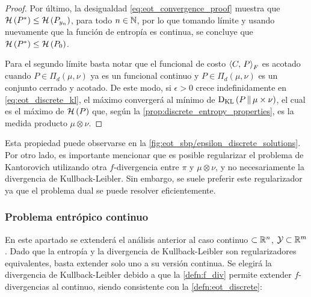 \begin{proof}
	Por último, la desigualdad \eqref{eq:eot_convergence_proof} muestra que $\mathcal{H}\left(P^*\right)\leq\mathcal{H}\left(P_{y_n}\right)$, para todo $n\in\mathbb{N}$, por lo que tomando límite y usando nuevamente que la función de entropía es continua, se concluye que $\mathcal{H}\left(P^*\right)\leq\mathcal{H}\left(P_0\right)$.

	Para el segundo límite basta notar que el funcional de costo $\left\langle C,\,P\right\rangle_F$ es acotado cuando $P\in\Pi_d(\mu,\nu)$ ya es un funcional continuo y $P\in\Pi_d(\mu,\nu)$ es un conjunto cerrado y acotado. De este modo, si $\epsilon>0$ crece indefinidamente en \eqref{eq:eot_discrete_kl}, el máximo convergerá al mínimo de $\operatorname{D_{KL}}\left(P\,\|\,\mu\times\nu\right)$, el cual es el máximo de $\mathcal{H}\left(P\right)$ que, según la \autoref{prop:discrete_entropy_properties}, es la medida producto $\mu\otimes\nu$.
\end{proof}

Esta propiedad puede observarse en la \autoref{fig:eot_sbp/epsilon_discrete_solutions}. Por otro lado, es importante mencionar que es posible regularizar el problema de Kantorovich utilizando otra $f$-divergencia entre $\pi$ y $\mu\otimes\nu$, y no necesariamente la divergencia de Kullback-Leibler. Sin embargo, se suele preferir este regularizador ya que el problema dual se puede resolver eficientemente.


\subsubsection{Problema entrópico continuo}

En este apartado se extenderá el análisis anterior al caso continuo $\subset\mathbb{R}^n$, $\mathcal{Y}\subset\mathbb{R}^m$. Dado que la entropía y la divergencia de Kullback-Leibler son regularizadores equivalentes, basta extender solo uno a su versión continua. Se elegirá la divergencia de Kullback-Leibler debido a que la \autoref{defn:f_div} permite extender $f$-divergencias al continuo, siendo consistente con la \autoref{defn:eot_discrete}:

